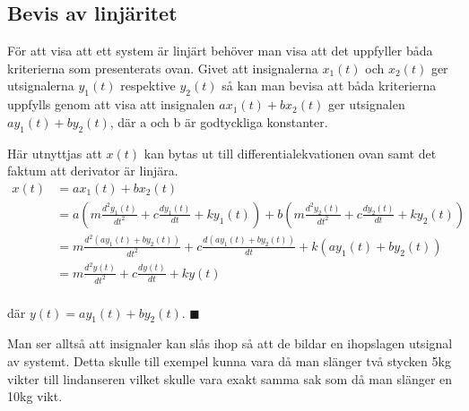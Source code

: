 \subsection{Bevis av linjäritet}
För att visa att ett system är linjärt behöver man visa att det uppfyller båda kriterierna som presenterats ovan. 
Givet att insignalerna $x_1(t)$ och $x_2(t)$ ger utsignalerna $y_1(t)$ respektive $y_2(t)$ så kan man bevisa att båda kriterierna uppfylls  genom att visa att insignalen $ax_1(t) + bx_2(t)$ ger utsignalen $ay_1(t) + by_2(t)$, där a och b är godtyckliga konstanter.

Här utnyttjas att $x(t)$  kan bytas ut till differentialekvationen ovan samt det faktum att derivator är linjära.
\begin{equation*} \label{eq1.6a}
\begin{split}
x(t)
&=ax_1(t)+bx_2(t)\\
&=a\left(m\frac{d^2y_1(t)}{dt^2}+c\frac{dy_1(t)}{dt}+ky_1(t)\right)+b\left(m\frac{d^2y_2(t)}{dt^2}+c\frac{dy_2(t)}{dt}+ky_2(t)\right)\\
&=m\frac{d^2(ay_1(t)+by_2(t))}{dt^2}+c\frac{d(ay_1(t)+by_2(t))}{dt}+k(ay_1(t)+by_2(t))\\
&=m\frac{d^2y(t)}{dt^2}+c\frac{dy(t)}{dt}+ky(t)\\
\end{split}
\end{equation*} 


där $y(t)=ay_1(t)+by_2(t)$. $\blacksquare$

Man ser alltså att insignaler kan slås ihop så att de bildar en ihopslagen utsignal av systemt. Detta skulle till exempel kunna vara då man slänger två stycken 5kg vikter till lindanseren vilket skulle vara exakt samma sak som då man slänger en 10kg vikt. 